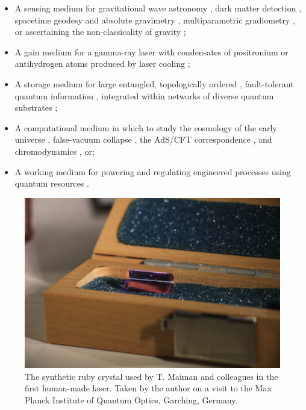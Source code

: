 	\begin{itemize}
	 \item A sensing medium for gravitational wave astronomy \cite{Kolkowitz16}, dark matter detection \cite{Derevianko14}, spacetime geodesy and absolute gravimetry \cite{Bidel20}, multiparametric gradiometry \cite{Hardman16}, or ascertaining the non-classicality of gravity \cite{Howl21};
	 \item A gain medium for a gamma-ray laser with condensates of positronium  \cite{Wang14} or antihydrogen atoms produced by laser cooling \cite{Baker21};
	 \item A storage medium \cite{Heller20} for large entangled, topologically ordered \cite{Zhang19}, fault-tolerant quantum information \cite{Briegel99}, integrated within networks of diverse quantum substrates \cite{Maring17};
	 \item A computational medium in which to study the cosmology of the early universe \cite{Fischer04}, false-vacuum collapse \cite{Ng21}, the AdS/CFT correspondence \cite{Wei21}, and chromodynamics \cite{Zohar15}, or;
	 \item A working medium \cite{Niedenzu19} for powering and regulating engineered processes using quantum resources \cite{Chitambar19}.
	\end{itemize}
	

	\begin{figure}
	\includegraphics[width=\textwidth]{fig/conclusion/maiman_ruby}
	\caption*{The synthetic ruby crystal used by T. Maiman and colleagues in the first human-made laser. Taken by the author on a visit to the Max Planck Institute of Quantum Optics, Garching, Germany.}
	\end{figure}


